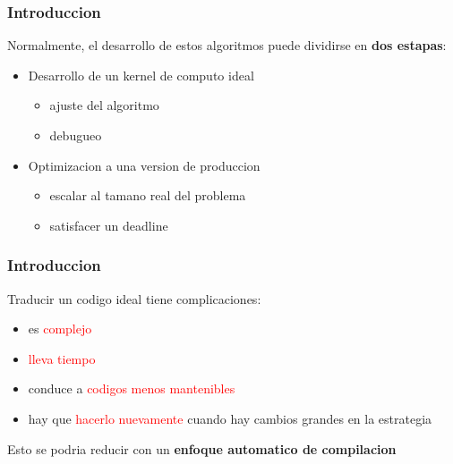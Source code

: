 \documentclass{beamer}\usetheme{Madrid} %
\begin{document}
\begin{frame}
\frametitle{Introduccion}
Normalmente, el desarrollo de estos 
algoritmos puede dividirse en \textbf{dos estapas}:
\begin{itemize}
\item Desarrollo de un kernel de computo ideal
	\begin{itemize} 
	\item ajuste del algoritmo
	\item debugueo
	\end{itemize}
\item Optimizacion a una version de produccion
	\begin{itemize}
	\item escalar al tamano real del problema
	\item satisfacer un deadline
	\end{itemize}
\end{itemize}
\end{frame}
\begin{frame}
\frametitle{Introduccion}
Traducir un codigo ideal tiene complicaciones: 
\begin{itemize} 
\item es \textcolor{red}{complejo}
\item \textcolor{red}{lleva tiempo}
\item conduce a \textcolor{red}{codigos menos mantenibles}
\item hay que \textcolor{red}{hacerlo nuevamente} cuando hay cambios grandes en la estrategia
\end{itemize}
Esto se podria reducir con un \textbf{enfoque automatico de compilacion}
\end{frame}
\end{document}
